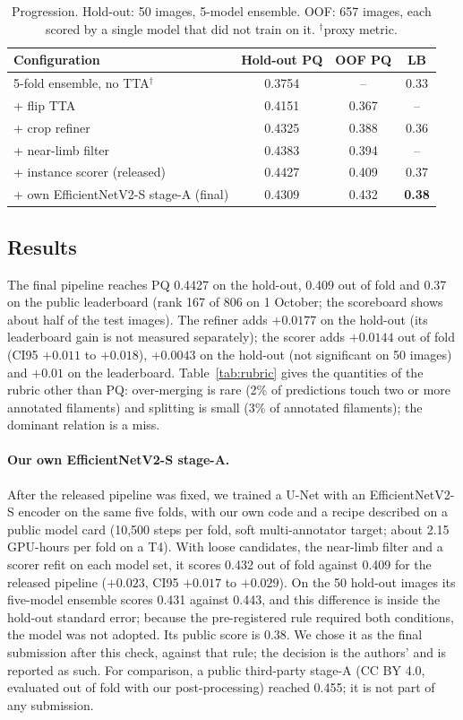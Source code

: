 \documentclass[sigconf]{acmart}
\begin{document}
\begin{table}[t]
\centering
\caption{Progression. Hold-out: 50 images, 5-model ensemble. OOF: 657 images, each scored by a single model that did not train on it. $^\dagger$proxy metric.}
\label{tab:main}
\small
\begin{tabular}{@{}lccc@{}}
\toprule
Configuration & Hold-out PQ & OOF PQ & LB\\
\midrule
5-fold ensemble, no TTA$^\dagger$ & 0.3754 & -- & 0.33\\
\quad + flip TTA & 0.4151 & 0.367 & --\\
\quad + crop refiner & 0.4325 & 0.388 & 0.36\\
\quad + near-limb filter & 0.4383 & 0.394 & --\\
\quad + instance scorer (released) & 0.4427 & 0.409 & 0.37\\
\quad + own EfficientNetV2-S stage-A (final) & 0.4309 & 0.432 & \textbf{0.38}\\
\bottomrule
\end{tabular}
\end{table}

\subsection{Results}
The final pipeline reaches PQ 0.4427 on the hold-out, 0.409 out of fold and 0.37 on the public leaderboard (rank 167 of 806 on 1 October; the scoreboard shows about half of the test images). The refiner adds $+0.0177$ on the hold-out (its leaderboard gain is not measured separately); the scorer adds $+0.0144$ out of fold (CI95 $+0.011$ to $+0.018$), $+0.0043$ on the hold-out (not significant on 50 images) and $+0.01$ on the leaderboard. Table~\ref{tab:rubric} gives the quantities of the rubric other than PQ: over-merging is rare (2\% of predictions touch two or more annotated filaments) and splitting is small (3\% of annotated filaments); the dominant relation is a miss.

\paragraph{Our own EfficientNetV2-S stage-A.} After the released pipeline was fixed, we trained a U-Net with an EfficientNetV2-S encoder on the same five folds, with our own code and a recipe described on a public model card (10,500 steps per fold, soft multi-annotator target; about 2.15 GPU-hours per fold on a T4). With loose candidates, the near-limb filter and a scorer refit on each model set, it scores 0.432 out of fold against 0.409 for the released pipeline ($+0.023$, CI95 $+0.017$ to $+0.029$). On the 50 hold-out images its five-model ensemble scores 0.431 against 0.443, and this difference is inside the hold-out standard error; because the pre-registered rule required both conditions, the model was not adopted. Its public score is 0.38. We chose it as the final submission after this check, against that rule; the decision is the authors' and is reported as such. For comparison, a public third-party stage-A (CC BY 4.0, evaluated out of fold with our post-processing) reached 0.455; it is not part of any submission.
\end{document}
